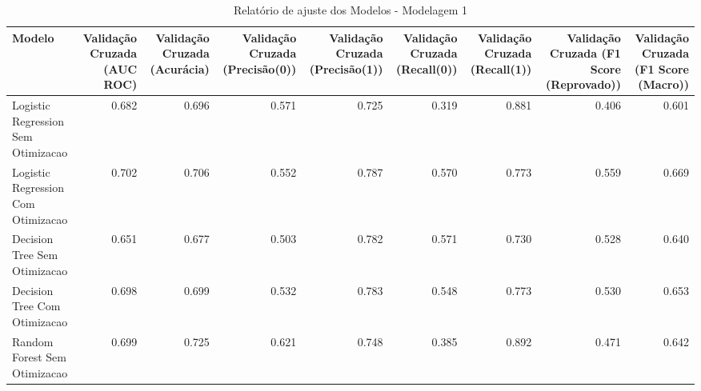 \begin{table}[H] %
    \centering
    \caption{Relatório de ajuste dos Modelos - Modelagem 1}
    \label{tab:relatorio_ajuste_modelagem_1}
    \renewcommand{\arraystretch}{1.25} %
    \begin{adjustwidth}{ -1in }{ -1in } %
    \centering %
    \small %
    \begin{tabular}{lrrrrrrrr}
\toprule
                            Modelo &  Validação Cruzada (AUC ROC) &  Validação Cruzada (Acurácia) &  Validação Cruzada (Precisão(0)) &  Validação Cruzada (Precisão(1)) &  Validação Cruzada (Recall(0)) &  Validação Cruzada (Recall(1)) &  Validação Cruzada (F1 Score (Reprovado)) &  Validação Cruzada (F1 Score (Macro)) \\
\midrule
Logistic Regression Sem Otimizacao &                        0.682 &                         0.696 &                            0.571 &                            0.725 &                          0.319 &                          0.881 &                                     0.406 &                                 0.601 \\
Logistic Regression Com Otimizacao &                        0.702 &                         0.706 &                            0.552 &                            0.787 &                          0.570 &                          0.773 &                                     0.559 &                                 0.669 \\
      Decision Tree Sem Otimizacao &                        0.651 &                         0.677 &                            0.503 &                            0.782 &                          0.571 &                          0.730 &                                     0.528 &                                 0.640 \\
      Decision Tree Com Otimizacao &                        0.698 &                         0.699 &                            0.532 &                            0.783 &                          0.548 &                          0.773 &                                     0.530 &                                 0.653 \\
      Random Forest Sem Otimizacao &                        0.699 &                         0.725 &                            0.621 &                            0.748 &                          0.385 &                          0.892 &                                     0.471 &                                 0.642 \\

\end{tabular}
\end{adjustwidth}
\end{table}
